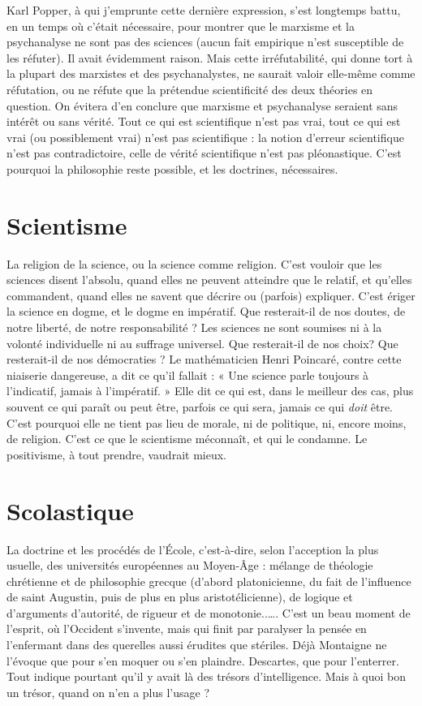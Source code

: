 Karl Popper, à qui j'emprunte cette dernière expression, s’est longtemps
battu, en un temps où c'était nécessaire, pour montrer que le marxisme et la
psychanalyse ne sont pas des sciences (aucun fait empirique n’est susceptible de
les réfuter). Il avait évidemment raison. Mais cette irréfutabilité, qui donne tort
à la plupart des marxistes et des psychanalystes, ne saurait valoir elle-même
comme réfutation, ou ne réfute que la prétendue scientificité des deux théories
en question. On évitera d’en conclure que marxisme et psychanalyse seraient
sans intérêt ou sans vérité. Tout ce qui est scientifique n’est pas vrai, tout ce qui
est vrai (ou possiblement vrai) n’est pas scientifique : la notion d’erreur scientifique
n’est pas contradictoire, celle de vérité scientifique n’est pas pléonastique.
C’est pourquoi la philosophie reste possible, et les doctrines, nécessaires.

\section{Scientisme}
La religion de la science, ou la science comme religion. C’est
vouloir que les sciences disent l'absolu, quand elles ne peuvent
atteindre que le relatif, et qu’elles commandent, quand elles ne savent que
décrire ou (parfois) expliquer. C’est ériger la science en dogme, et le dogme en
impératif. Que resterait-il de nos doutes, de notre liberté, de notre
responsabilité ? Les sciences ne sont soumises ni à la volonté individuelle ni au
suffrage universel. Que resterait-il de nos choix? Que resterait-il de nos
démocraties ? Le mathématicien Henri Poincaré, contre cette niaiserie dangereuse,
a dit ce qu’il fallait : « Une science parle toujours à l'indicatif, jamais à
l'impératif. » Elle dit ce qui est, dans le meilleur des cas, plus souvent ce qui
paraît ou peut être, parfois ce qui sera, jamais ce qui {\it doit} être. C’est pourquoi
elle ne tient pas lieu de morale, ni de politique, ni, encore moins, de religion.
C’est ce que le scientisme méconnaît, et qui le condamne. Le positivisme, à
tout prendre, vaudrait mieux.

\section{Scolastique}
La doctrine et les procédés de l’École, c’est-à-dire, selon l’acception
la plus usuelle, des universités européennes au
Moyen-Âge : mélange de théologie chrétienne et de philosophie grecque
(d’abord platonicienne, du fait de l'influence de saint Augustin, puis de plus en
plus aristotélicienne), de logique et d'arguments d’autorité, de rigueur et de
monotonie..…. C’est un beau moment de l’esprit, où l'Occident s’invente, mais
qui finit par paralyser la pensée en l’enfermant dans des querelles aussi érudites
que stériles. Déjà Montaigne ne l’évoque que pour s’en moquer ou s’en
plaindre. Descartes, que pour l’enterrer. Tout indique pourtant qu’il y avait là
des trésors d’intelligence. Mais à quoi bon un trésor, quand on n’en a plus
l'usage ?

